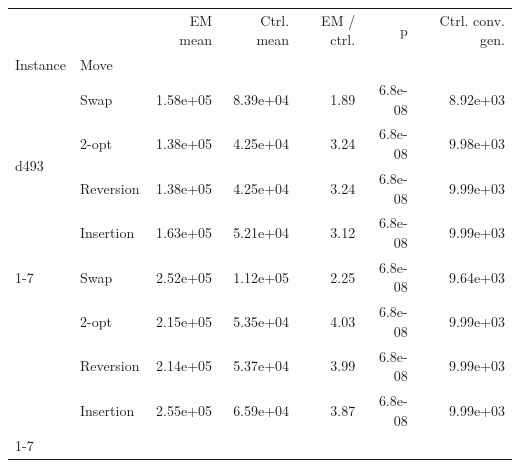 \begin{tabular}{llrrrrr}
\toprule
 &  & EM mean & Ctrl. mean & EM / ctrl. & p & Ctrl. conv. gen. \\
Instance & Move &  &  &  &  &  \\
\midrule
\multirow[t]{4}{*}{d493} & Swap & 1.58e+05 & 8.39e+04 & 1.89 & 6.8e-08 & 8.92e+03 \\
 & 2-opt & 1.38e+05 & 4.25e+04 & 3.24 & 6.8e-08 & 9.98e+03 \\
 & Reversion & 1.38e+05 & 4.25e+04 & 3.24 & 6.8e-08 & 9.99e+03 \\
 & Insertion & 1.63e+05 & 5.21e+04 & 3.12 & 6.8e-08 & 9.99e+03 \\
\cline{1-7}
\multirow[t]{4}{*}{u574} & Swap & 2.52e+05 & 1.12e+05 & 2.25 & 6.8e-08 & 9.64e+03 \\
 & 2-opt & 2.15e+05 & 5.35e+04 & 4.03 & 6.8e-08 & 9.99e+03 \\
 & Reversion & 2.14e+05 & 5.37e+04 & 3.99 & 6.8e-08 & 9.99e+03 \\
 & Insertion & 2.55e+05 & 6.59e+04 & 3.87 & 6.8e-08 & 9.99e+03 \\
\cline{1-7}
\bottomrule
\end{tabular}
